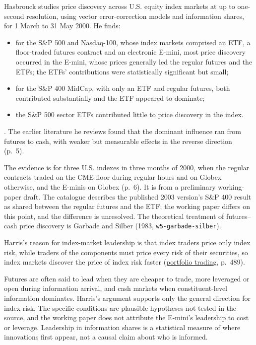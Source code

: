 \begin{qfevidence}\label{ev:index-futures-price-discovery}
 Hasbrouck studies price discovery across U.S. equity index markets at up to one-second resolution, using vector error-correction models and information shares, for 1 March to 31 May 2000. He finds:
\begin{itemize}
\item for the S\&P 500 and Nasdaq-100, whose index markets comprised an ETF, a floor-traded futures contract and an electronic E-mini, most price discovery occurred in the E-mini, whose prices generally led the regular futures and the ETFs; the ETFs' contributions were statistically significant but small;
\item for the S\&P 400 MidCap, with only an ETF and regular futures, both contributed substantially and the ETF appeared to dominate;
\item the S\&P 500 sector ETFs contributed little to price discovery in the index.
\end{itemize}
\citep[NYU working paper FIN-00-046, draft of 16 November 2000, abstract and pp.~4--5, 13 and~34]{ex-hasbrouck-2003}. The earlier literature he reviews found that the dominant influence ran from futures to cash, with weaker but measurable effects in the reverse direction (p.~5).

 The evidence is for three U.S. indexes in three months of 2000, when the regular contracts traded on the CME floor during regular hours and on Globex otherwise, and the E-minis on Globex (p.~6). It is from a preliminary working-paper draft. The catalogue describes the published 2003 version's S\&P 400 result as shared between the regular futures and the ETF; the working paper differs on this point, and the difference is unresolved. The theoretical treatment of futures--cash price discovery is Garbade and Silber (1983, \nolinkurl{w5-garbade-silber}).

 Harris's reason for index-market leadership is that index traders price only index risk, while traders of the components must price every risk of their securities, so index markets discover the price of index risk faster (\hyperref[def:portfolio-trading]{portfolio trading}, p.~489).

 Futures are often said to lead when they are cheaper to trade, more leveraged or open during information arrival, and cash markets when constituent-level information dominates. Harris's argument supports only the general direction for index risk. The specific conditions are plausible hypotheses not tested in the source, and the working paper does not attribute the E-mini's leadership to cost or leverage. Leadership in information shares is a statistical measure of where innovations first appear, not a causal claim about who is informed.


\end{qfevidence}
